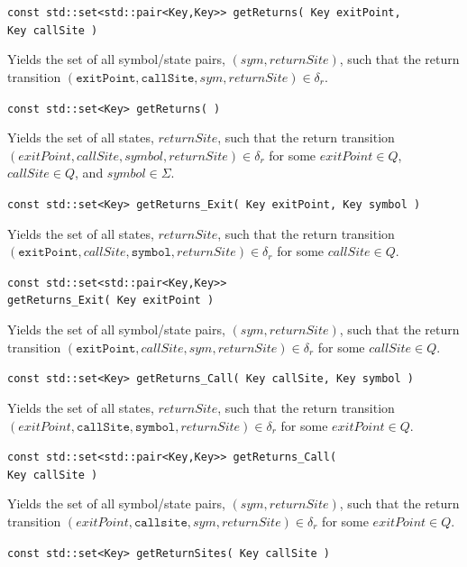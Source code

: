 \documentclass{llncs}
\begin{document}
\begin{description}
  \item\texttt{const std::set<std::pair<Key,Key>> getReturns( Key exitPoint,\\ \hspace*{3.25cm} Key callSite )}

    Yields the set of all symbol/state pairs, $(sym,returnSite)$, such that the return transition $(\texttt{exitPoint},\texttt{callSite},sym,returnSite) \in \delta_r$.

  \item\texttt{const std::set<Key> getReturns( )}

    Yields the set of all states, $returnSite$, such that the return transition $(exitPoint,callSite,symbol,returnSite) \in \delta_r$ for some $exitPoint \in Q$, $callSite \in Q$, and $symbol \in \Sigma$.

  \item\texttt{const std::set<Key> getReturns\_Exit( Key exitPoint, Key symbol )}

    Yields the set of all states, $returnSite$, such that the return transition $(\texttt{exitPoint},callSite,\texttt{symbol},returnSite) \in \delta_r$ for some $callSite \in Q$.

  \item\texttt{const std::set<std::pair<Key,Key>> \\getReturns\_Exit( Key exitPoint )}

    Yields the set of all symbol/state pairs, $(sym,returnSite)$, such that the return transition $(\texttt{exitPoint},callSite,sym,returnSite) \in \delta_r$ for some $callSite \in Q$.

  \item\texttt{const std::set<Key> getReturns\_Call( Key callSite, Key symbol )}

    Yields the set of all states, $returnSite$, such that the return transition $(exitPoint,\texttt{callSite},\texttt{symbol},returnSite) \in \delta_r$ for some $exitPoint \in Q$.

  \item\texttt{const std::set<std::pair<Key,Key>> getReturns\_Call( \\ \hspace*{3.25cm} Key callSite )}

    Yields the set of all symbol/state pairs, $(sym,returnSite)$, such that the return transition $(exitPoint,\texttt{callsite},sym,returnSite) \in \delta_r$ for some $exitPoint \in Q$.

  \item\texttt{const std::set<Key> getReturnSites( Key callSite )}


\end{description}
\end{document}
